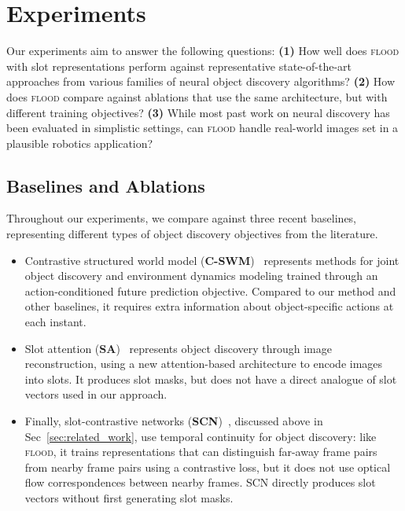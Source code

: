 \documentclass{article}
\begin{document}
\section{Experiments}
\label{sec:experiments}

Our experiments aim to answer the following questions: \textbf{(1)} How well does \textsc{flood} with slot representations perform against representative state-of-the-art approaches from various families of neural object discovery algorithms? \textbf{(2)} How does \textsc{flood} compare against ablations that use the same architecture, but with different training objectives? \textbf{(3)} While most past work on neural discovery has been evaluated in simplistic settings, can \textsc{flood} handle real-world images set in a plausible robotics application?


\subsection{Baselines and Ablations}\label{sec:baselines}

Throughout our experiments, we compare against three recent baselines, representing different types of object discovery objectives from the literature. 

\begin{itemize}[leftmargin=*]
 \item Contrastive structured world model (\textbf{C-SWM})~\cite{kipf2019contrastive} represents methods for joint object discovery and environment dynamics modeling trained through an action-conditioned future prediction objective. Compared to our method and other baselines, it requires extra information about object-specific actions at each instant. 
 \item  Slot attention (\textbf{SA})~\cite{locatello2020object} represents object discovery through image reconstruction, using a new attention-based architecture to encode images into slots. It produces slot masks, but does not have a direct analogue of slot vectors used in our approach. 
 \item  Finally, slot-contrastive networks (\textbf{SCN})~\cite{racah2020slot}, discussed above in Sec~\ref{sec:related_work}, use temporal continuity for object discovery: like \textsc{flood}, it trains representations that can distinguish far-away frame pairs from nearby frame pairs using a contrastive loss, but it does not use optical flow correspondences between nearby frames. SCN directly produces slot vectors without first generating slot masks.
\end{itemize}
\end{document}

